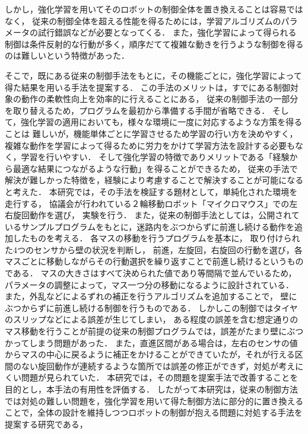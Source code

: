 \documentclass[a4paper,11pt]{jsarticle}
\begin{document}
しかし，強化学習を用いてそのロボットの制御全体を置き換えることは容易ではなく，
従来の制御全体を超える性能を得るためには，学習アルゴリズムのパラメータの試行錯誤などが必要となってくる．
また，強化学習によって得られる制御は条件反射的な行動が多く，順序だてて複雑な動きを行うような制御を得るのは難しいという特徴\cite{遺伝的プログラミングと強化学習の統合に基づく実ロボットの行動獲得}があった．\par
そこで，既にある従来の制御手法をもとに，その機能ごとに，強化学習によって得た結果を用いる手法を提案する．
この手法のメリットは，すでにある制御対象の動作の柔軟性向上を効率的に行えることにある，
従来の制御手法の一部分を取り替えるため，プログラムを最初から準備する手間が省略できる．
そして，強化学習の適用においても，様々な環境に一度に対応するような方策を得ることは
難しいが，機能単体ごとに学習させるため学習の行い方を決めやすく，
複雑な動作を学習によって得るために労力をかけて学習方法を設計する必要もなく，学習を行いやすい．
そして強化学習の特徴でありメリットである「経験から最適な結果につながるような行動」を得ることができるため，
従来の手法で解決が難しかった特徴を，経験により考慮することで解決することが可能になると考えた．
本研究では，その手法を検証する題材として，単純化された環境を走行する，
協議会が行われている２輪移動ロボット「マイクロマウス」での左右旋回動作を選び，
実験を行う．%
また，従来の制御手法としては，公開されているサンプルプログラムをもとに，迷路内をぶつからずに前進し続ける動作を追加したものを考える．
各マスの移動を行うプログラムを基本に，
取り付けられた4つのセンサから壁の状況を判断し，
前進，左旋回，右旋回の行動を選び，各マスごとに移動しながらその行動選択を繰り返すことで前進し続けるというものである．
マスの大きさはすべて決められた値であり等間隔で並んでいるため，パラメータの調整によって，マス一つ分の移動になるように設計されている．
また，外乱などによるずれの補正を行うアルゴリズムを追加することで，
壁にぶつからずに前進し続ける制御を行うものである．
しかしこの制御ではタイヤのスリップなどによる誤差が生じてしまい，
ある程度の誤差を含む想定通りのマス移動を行うことが前提の従来の制御プログラムでは，誤差がたまり壁にぶつかってしまう問題があった．
また，直進区間がある場合は，左右のセンサの値からマスの中心に戻るように補正をかけることができていたが，それが行える区間のない旋回動作が連続するような箇所では誤差の修正ができず，対処が考えにくい問題が見られていた．
本研究では，その問題を提案手法で改善することを目的とし，本手法の有用性を評価する．
したがって本研究は，従来の制御方法では対処の難しい問題を，強化学習を用いて得た制御方法に部分的に置き換えることで，全体の設計を維持しつつロボットの制御が抱える問題に対処する手法を提案する研究である，
\end{document}
